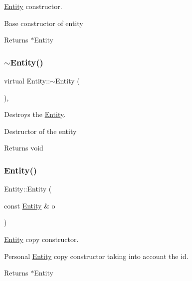 \hyperlink{class_entity}{Entity} constructor. 

Base constructor of entity

\begin{DoxyReturn}{Returns}
$\ast$\+Entity 
\end{DoxyReturn}
\mbox{\label{class_entity_a6216319e71da21b7708bbfeb537c4d0f}} 
\subsubsection{\texorpdfstring{$\sim$\+Entity()}{~Entity()}}
{\footnotesize\ttfamily virtual Entity\+::$\sim$\+Entity (\begin{DoxyParamCaption}{ }\end{DoxyParamCaption})\hspace{0.3cm}{\ttfamily [inline]}, {}}



Destroys the \hyperlink{class_entity}{Entity}. 

Destructor of the entity

\begin{DoxyReturn}{Returns}
void 
\end{DoxyReturn}
\mbox{\label{class_entity_ad758dc48d715e48ada4193517f1d32ea}} 
\subsubsection{\texorpdfstring{Entity()}{Entity()}\hspace{0.1cm}{\footnotesize\ttfamily [2/2]}}
{\footnotesize\ttfamily Entity\+::\+Entity (\begin{DoxyParamCaption}\item[{const \hyperlink{class_entity}{Entity} \&}]{o }\end{DoxyParamCaption})}



\hyperlink{class_entity}{Entity} copy constructor. 

Personal \hyperlink{class_entity}{Entity} copy constructor taking into account the id.

\begin{DoxyReturn}{Returns}
$\ast$\+Entity 
\end{DoxyReturn}


